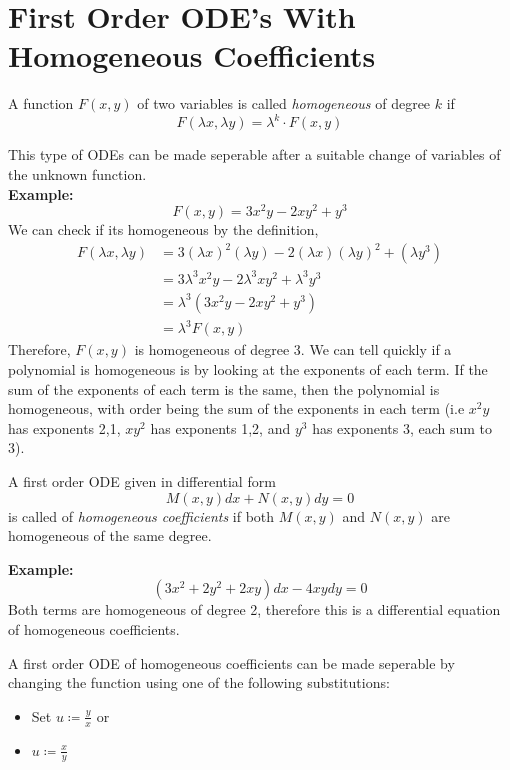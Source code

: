 \documentclass[openany]{report}
\begin{document}
\section{First Order ODE's With Homogeneous Coefficients}
\begin{definition}
    A function $F(x,y)$ of two variables is called \emph{homogeneous} of degree $k$ if 
    \[F(\lambda x, \lambda y) = \lambda^k \cdot F(x,y)\]
\end{definition}
This type of ODEs can be made seperable after a suitable change of variables of the unknown function.\\[2ex]
\noindent
\textbf{Example:}
\[F(x,y) = 3x^2y - 2xy^2 + y^3\]
We can check if its homogeneous by the definition, 
\begin{align*}
    F(\lambda x, \lambda y) &= 3(\lambda x)^2 (\lambda y) - 2(\lambda x) (\lambda y)^2 + (\lambda y^3)\\
    &= 3\lambda^3x^2y - 2\lambda^3xy^2 + \lambda^3y^3\\
    &= \lambda^3(3x^2y - 2xy^2 + y^3)\\
    &= \lambda^3F(x,y)
\end{align*}
Therefore, $F(x,y)$ is homogeneous of degree 3. We can tell quickly if a polynomial is homogeneous is by looking at the exponents of each term. If the sum of the exponents of each term is the same, then the polynomial is homogeneous, with order being the sum of the exponents in each term (i.e $x^2y$ has exponents 2,1, $xy^2$ has exponents 1,2, and $y^3$ has exponents 3, each sum to 3).\\[2ex]
\begin{definition}
    A first order ODE given in differential form
    \[M(x,y)dx + N(x,y)dy = 0\]
    is called of \emph{homogeneous coefficients} if both $M(x,y)$ and $N(x,y)$ are homogeneous of the same degree.
\end{definition}
\noindent
\textbf{Example:}
\[(3x^2+2y^2+2xy)dx - 4xydy = 0\]
Both terms are homogeneous of degree 2, therefore this is a differential equation of homogeneous coefficients. 
\begin{theorem}
    A first order ODE of homogeneous coefficients can be made seperable by changing the function using one of the following substitutions:
    \begin{itemize}
        \item Set $u \coloneqq \frac{y}{x}$ or
        \item $u \coloneqq \frac{x}{y}$
    \end{itemize}
\end{theorem}
\end{document}

